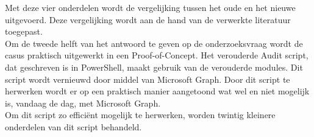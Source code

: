 Met deze vier onderdelen wordt de vergelijking tussen het oude en het nieuwe uitgevoerd. Deze vergelijking wordt aan de hand van de verwerkte literatuur toegepast.  \\

Om de tweede helft van het antwoord te geven op de onderzoeksvraag wordt de casus praktisch uitgewerkt in een Proof-of-Concept. Het verouderde Audit script, dat geschreven is in PowerShell, maakt gebruik van de verouderde modules. Dit script wordt vernieuwd door middel van Microsoft Graph. Door dit script te herwerken wordt er op een praktisch manier aangetoond wat wel en niet mogelijk is, vandaag de dag, met Microsoft Graph. \\

Om dit script zo efficiënt mogelijk te herwerken, worden twintig kleinere onderdelen van dit script behandeld. \\

